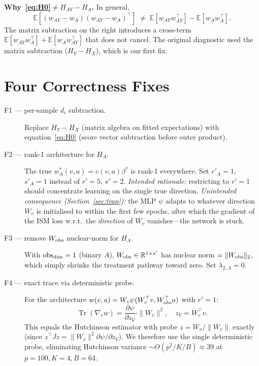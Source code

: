 \documentclass[11pt]{article}
\newcommand{\R}{\mathbb{R}}
\newcommand{\E}{\mathbb{E}}
\begin{document}
\medskip\noindent
\textbf{Why~\eqref{eq:H0}$\neq H_{AY}-H_A$.}
In general,
\[
\E\!\left[(w_{AY}-w_A)(w_{AY}-w_A)^\top\right]
\;\neq\;
\E[w_{AY}w_{AY}^\top]-\E[w_Aw_A^\top].
\]
The matrix subtraction on the right introduces a cross-term
$\E[w_{AY}w_A^\top]+\E[w_Aw_{AY}^\top]$ that does not cancel.  The original
diagnostic used the matrix subtraction ($H_Y - H_X$), which is our first fix.

\section{Four Correctness Fixes}

\begin{description}
\item[F1 — per-sample $d_i$ subtraction.]
Replace $H_Y-H_X$ (matrix algebra on fitted expectations) with
equation~\eqref{eq:H0} (score vector subtraction before outer product).

\item[F2 — rank-1 architecture for $H_A$.]
The true $w_A^*(v,a)=c(v,a)\beta^*$ is rank-1 everywhere.
Set $r'_A=1$, $s'_A=1$ instead of $r'=5$, $s'=2$.
\emph{Intended rationale:} restricting to $r'=1$ should concentrate learning on
the single true direction.
\emph{Unintended consequence (Section~\ref{sec:trap}):} the MLP $\psi$
adapts to whatever direction $W_v$ is initialised to within the first few epochs,
after which the gradient of the ISM loss w.r.t.\ the \emph{direction} of $W_v$
vanishes—the network is stuck.

\item[F3 — remove $W_{\rm obs}$ nuclear-norm for $H_A$.]
With $\text{obs}_{\rm dim}=1$ (binary $A$), $W_{\rm obs}\in\R^{1\times s'}$ has
nuclear norm $=\|W_{\rm obs}\|_2$, which simply shrinks the treatment pathway
toward zero.  Set $\lambda_{2,A}=0$.

\item[F4 — exact trace via deterministic probe.]
For the architecture $w(v,a)=W_v\psi(W_v^\top v,W_{\rm obs}^\top a)$ with $r'=1$:
\[
\operatorname{Tr}\!\left(\nabla_v w\right)
=\frac{\partial\psi}{\partial z_V}\cdot\|W_v\|^2,
\quad z_V=W_v^\top v.
\]
This equals the Hutchinson estimator with probe $z=W_v/\|W_v\|$ exactly (since
$z^\top J z = \|W_v\|^2\partial\psi/\partial z_V$).  We therefore use the single
deterministic probe, eliminating Hutchinson variance
$\sim O(p^2/K/B)\approx 39$ at $p=100,K=4,B=64$.
\end{description}
\end{document}
